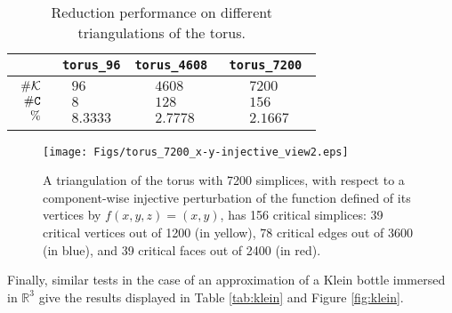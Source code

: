 \documentclass[12pt]{article}
\newcommand{\R}{{\mathbb R}}
\newcommand{\cK}{{\cal K}}
\newcommand{\sC}{\texttt{C}} \newcommand{\sD}{\texttt{D}} \newcommand{\sM}{\texttt{M}} \newcommand{\sL}{\texttt{L}}
\begin{document}
\begin{table}[h]
\caption{Reduction performance on different triangulations of the torus.}
\begin{center}
\begin{tabular}{| c | c | c | c|}
\hline
 & \tt{torus\_96}&
 \tt{torus\_4608} & \tt{torus\_7200} \\
 \hline
  $\begin{array}{rrr}\# \cK\\ \# \sC\\ \% \end{array}$ &
 $\begin{array}{rrr}  96 \\8 \\8.3333  \end{array}$ &
$\begin{array}{rrr}  4608 \\128 \\ 2.7778  \end{array}$ &
$\begin{array}{rrr}  7200 \\156 \\  2.1667  \end{array}$
\\
 \hline
 \end{tabular}
 \end{center}
\label{tab:torus}
\end{table}


\begin{figure}[ht]
\begin{center}
\texttt{[image: Figs/torus\_7200\_x-y-injective\_view2.eps]}
  \caption{A triangulation of the torus with 7200 simplices, with respect to a component-wise injective perturbation of the function defined of its vertices by $f(x,y,z)=(x,y)$, has 156 critical simplices: 39 critical vertices  out of 1200  (in yellow), 78 critical edges  out of 3600 (in blue),  and 39 critical faces  out of 2400 (in red).
 }
\end{center}
\label{fig:torus}
\end{figure}


Finally, similar tests in the case of an approximation of a Klein bottle immersed in $\R^3$ give the results displayed in Table \ref{tab:klein} and Figure \ref{fig:klein}.
\end{document}

